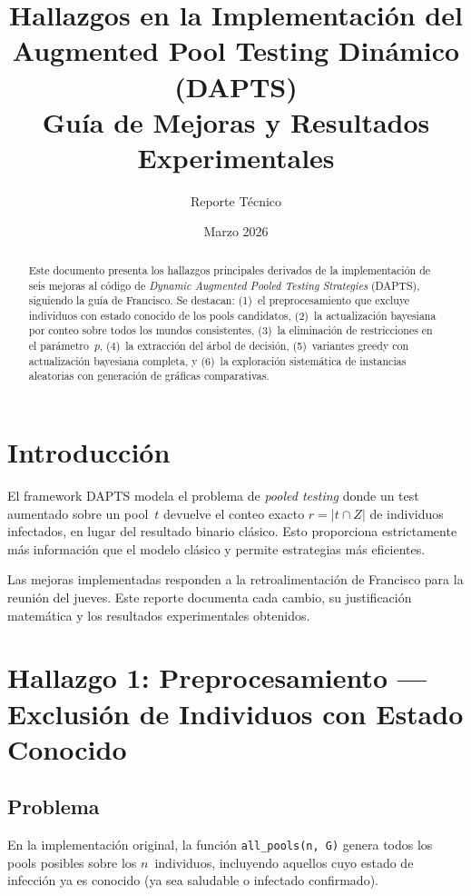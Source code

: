 \documentclass[11pt, a4paper]{article}
\title{Hallazgos en la Implementaci\'on del\\
\textbf{Augmented Pool Testing Din\'amico (DAPTS)}\\[0.5em]
\large Gu\'ia de Mejoras y Resultados Experimentales}
\author{Reporte T\'ecnico}
\date{Marzo 2026}
\begin{document}
\maketitle

\begin{abstract}
Este documento presenta los hallazgos principales derivados de la implementaci\'on
de seis mejoras al c\'odigo de \textit{Dynamic Augmented Pooled Testing Strategies}
(DAPTS), siguiendo la gu\'ia de Francisco. Se destacan: (1)~el preprocesamiento
que excluye individuos con estado conocido de los pools candidatos, (2)~la
actualizaci\'on bayesiana por conteo sobre todos los mundos consistentes,
(3)~la eliminaci\'on de restricciones en el par\'ametro~$p$, (4)~la extracci\'on
del \'arbol de decisi\'on, (5)~variantes greedy con actualizaci\'on bayesiana
completa, y (6)~la exploraci\'on sistem\'atica de instancias aleatorias con
generaci\'on de gr\'aficas comparativas.
\end{abstract}

\tableofcontents
\newpage

\section{Introducci\'on}

El framework DAPTS modela el problema de \textit{pooled testing} donde un test
aumentado sobre un pool~$t$ devuelve el conteo exacto $r = |t \cap Z|$ de
individuos infectados, en lugar del resultado binario cl\'asico. Esto proporciona
estrictamente m\'as informaci\'on que el modelo cl\'asico y permite estrategias
m\'as eficientes.

Las mejoras implementadas responden a la retroalimentaci\'on de Francisco para
la reuni\'on del jueves. Este reporte documenta cada cambio, su justificaci\'on
matem\'atica y los resultados experimentales obtenidos.

\section{Hallazgo 1: Preprocesamiento --- Exclusi\'on de Individuos con Estado Conocido}

\subsection{Problema}
En la implementaci\'on original, la funci\'on \texttt{all\_pools(n, G)} genera
todos los pools posibles sobre los $n$~individuos, incluyendo aquellos cuyo
estado de infecci\'on ya es conocido (ya sea saludable o infectado confirmado).
\end{document}
